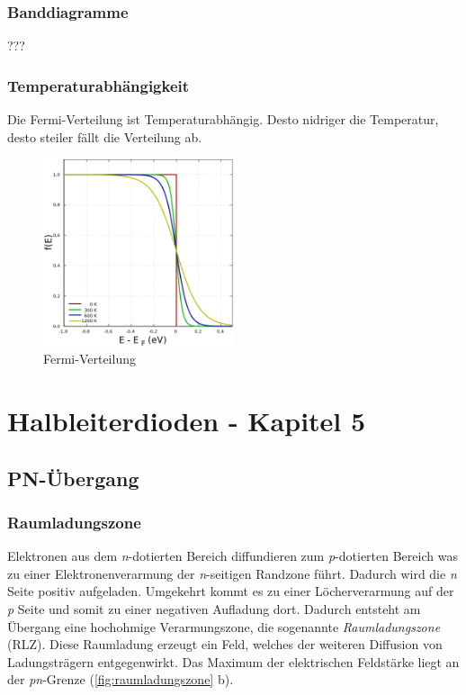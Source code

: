 \documentclass{article}
\begin{document}
    \subsubsection{Banddiagramme}
    ???
    \subsubsection{Temperaturabh\"angigkeit}
    Die Fermi-Verteilung ist Temperaturabh\"angig. Desto nidriger die Temperatur, desto steiler f\"allt die Verteilung ab.
    \begin{figure}[H]
        \centering
        \includegraphics[width=0.5\textwidth]{fig/fermi}
        \caption{Fermi-Verteilung}
        \label{fig:fermi}
    \end{figure}

\section{Halbleiterdioden - Kapitel 5}
\subsection{PN-Übergang }\label{k5:pn}
    
    \subsubsection{Raumladungszone}
	Elektronen aus dem \textit{n}-dotierten Bereich diffundieren zum \textit{p}-dotierten Bereich was zu einer Elektronenverarmung der \textit{n}-seitigen Randzone führt. 
	Dadurch wird die \textit{n} Seite positiv aufgeladen. Umgekehrt kommt es zu einer Löcherverarmung auf der \textit{p} Seite und somit zu einer negativen Aufladung dort. 
    Dadurch entsteht am Übergang eine hochohmige Verarmungszone, die sogenannte \textit{Raumladungszone} (RLZ).
    Diese Raumladung erzeugt ein Feld, welches der weiteren Diffusion von Ladungsträgern entgegenwirkt. Das Maximum der elektrischen Feldstärke liegt an der \textit{pn}-Grenze (\ref{fig:raumladungszone} b).
    
\end{document}
